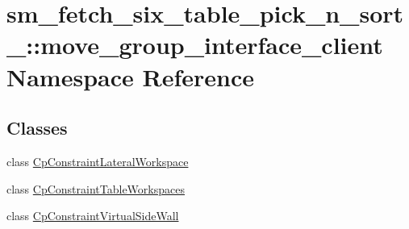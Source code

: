 \hypertarget{namespacesm__fetch__six__table__pick__n__sort__1_1_1move__group__interface__client}{}\section{sm\+\_\+fetch\+\_\+six\+\_\+table\+\_\+pick\+\_\+n\+\_\+sort\+\_\+:\+:move\+\_\+group\+\_\+interface\+\_\+client Namespace Reference}
\label{namespacesm__fetch__six__table__pick__n__sort__1_1_1move__group__interface__client}
\subsection*{Classes}
\begin{DoxyCompactItemize}
\item 
class \hyperlink{classsm__fetch__six__table__pick__n__sort__1_1_1move__group__interface__client_1_1CpConstraintLateralWorkspace}{Cp\+Constraint\+Lateral\+Workspace}
\item 
class \hyperlink{classsm__fetch__six__table__pick__n__sort__1_1_1move__group__interface__client_1_1CpConstraintTableWorkspaces}{Cp\+Constraint\+Table\+Workspaces}
\item 
class \hyperlink{classsm__fetch__six__table__pick__n__sort__1_1_1move__group__interface__client_1_1CpConstraintVirtualSideWall}{Cp\+Constraint\+Virtual\+Side\+Wall}
\end{DoxyCompactItemize}
